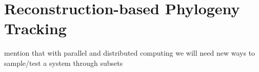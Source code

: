 \section{Reconstruction-based Phylogeny Tracking}

\citep{moreno2022hstrat,moreno2024guide}

mention that with parallel and distributed computing we will need new ways to sample/test a system through subsets
